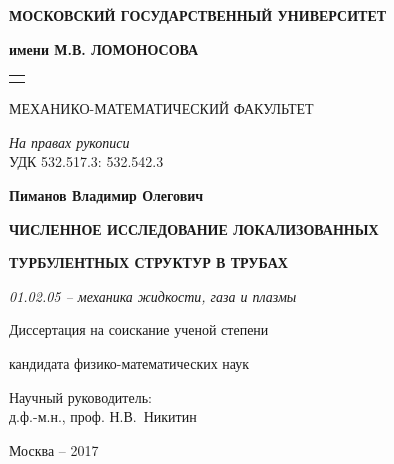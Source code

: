 \begin{titlepage}
\newpage
\pagestyle{plain} \thispagestyle{empty}

\centerline{\bf МОСКОВСКИЙ ГОСУДАРСТВЕННЫЙ УНИВЕРСИТЕТ} \vspace{-1pt}
\centerline{\bf имени М.В. ЛОМОНОСОВА} \vspace{-25pt}
\begin{center}
\begin{tabular}{p{\textwidth}}
\hline {}
\end{tabular}
\end{center}
\par
\vspace{-20pt}\centerline{МЕХАНИКО-МАТЕМАТИЧЕСКИЙ ФАКУЛЬТЕТ}
\par
\vspace*{1cm}
\begin{flushright}
{\it На правах рукописи}\\
УДК 532.517.3: 532.542.3\\

\end{flushright}
\par
\vspace*{1.5cm} \centerline{\bf Пиманов Владимир Олегович}
\vspace*{1cm} \centerline {\bf ЧИСЛЕННОЕ ИССЛЕДОВАНИЕ ЛОКАЛИЗОВАННЫХ}
 \centerline  {\bf ТУРБУЛЕНТНЫХ СТРУКТУР В ТРУБАХ}

\vspace*{1cm} \centerline{\it  01.02.05 -- механика жидкости, газа и плазмы}

\vspace*{1cm} \centerline{Диссертация на соискание ученой степени }
\centerline{кандидата физико-математических наук}

\vspace{30mm} \hfill\parbox[t]{80mm}{
Научный руководитель: \\
д.ф.-м.н., проф. Н.В.~Никитин}

\par
\vspace*{4cm} \centerline{Москва -- 2017}

\end{titlepage}
